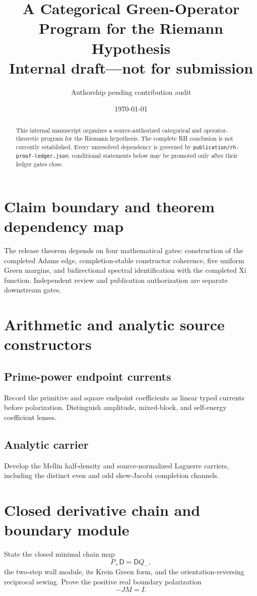 \documentclass[11pt]{article}
\title{A Categorical Green-Operator Program for the Riemann Hypothesis\\
\large Internal draft---not for submission}
\author{Authorship pending contribution audit}
\date{\today}
\begin{document}
\maketitle
\begin{abstract}
This internal manuscript organizes a source-authorized categorical and operator-theoretic program for the Riemann hypothesis. The complete RH conclusion is not currently established. Every unresolved dependency is governed by \texttt{publication/rh-proof-ledger.json}; conditional statements below may be promoted only after their ledger gates close.
\end{abstract}

\section{Claim boundary and theorem dependency map}
The release theorem depends on four mathematical gates: construction of the completed Adams edge, completion-stable constructor coherence, five uniform Green margins, and bidirectional spectral identification with the completed Xi function. Independent review and publication authorization are separate downstream gates.

\section{Arithmetic and analytic source constructors}
\subsection{Prime-power endpoint currents}
Record the primitive and square endpoint coefficients as linear typed currents before polarization. Distinguish amplitude, mixed-block, and self-energy coefficient lenses.

\subsection{Analytic carrier}
Develop the Mellin half-density and source-normalized Laguerre carriers, including the distinct even and odd skew-Jacobi completion channels.

\section{Closed derivative chain and boundary module}
State the closed minimal chain map
\[
P_+\mathsf D=\mathsf DQ_-,
\]
the two-step wall module, its Krein Green form, and the orientation-reversing reciprocal sewing. Prove the positive real boundary polarization
\[
-JM=I.
\]
\end{document}
